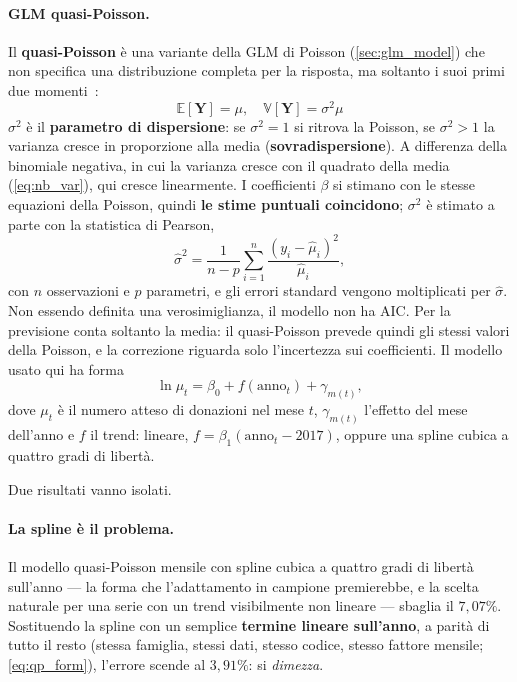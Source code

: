 \paragraph{GLM quasi-Poisson.}
Il \textbf{quasi-Poisson} è una variante della GLM di Poisson
(\cref{sec:glm_model}) che non specifica una distribuzione completa per la
risposta, ma soltanto i suoi primi due momenti~\cite{McCullaghNelder1989}:
\begin{equation}
    \mathbb{E}[\mathbf{Y}] = \mu, \quad \mathbb{V}[\mathbf{Y}] = \sigma^{2}\mu
\end{equation}
$\sigma^{2}$ è il \textbf{parametro di dispersione}: se $\sigma^{2} = 1$ si
ritrova la Poisson, se $\sigma^{2} > 1$ la varianza cresce in proporzione alla
media (\textbf{sovradispersione}). A differenza della binomiale negativa, in cui
la varianza cresce con il quadrato della media (\cref{eq:nb_var}), qui cresce
linearmente.
\newline
I coefficienti $\beta$ si stimano con le stesse equazioni della Poisson, quindi
\textbf{le stime puntuali coincidono}; $\sigma^{2}$ è stimato a parte con la
statistica di Pearson,
\begin{equation}
    \hat{\sigma}^{2} = \frac{1}{n-p}\sum_{i=1}^{n}
    \frac{(y_{i}-\hat{\mu}_{i})^{2}}{\hat{\mu}_{i}},
\end{equation}
con $n$ osservazioni e $p$ parametri, e gli errori standard vengono
moltiplicati per $\hat{\sigma}$. Non essendo definita una verosimiglianza, il
modello non ha AIC.
\newline
Per la previsione conta soltanto la media: il quasi-Poisson prevede quindi gli
stessi valori della Poisson, e la correzione riguarda solo l'incertezza sui
coefficienti. Il modello usato qui ha forma
\begin{equation}
    \ln \mu_{t} = \beta_{0} + f(\text{anno}_{t}) + \gamma_{m(t)},
    \label{eq:qp_form}
\end{equation}
dove $\mu_{t}$ è il numero atteso di donazioni nel mese $t$, $\gamma_{m(t)}$
l'effetto del mese dell'anno e $f$ il trend: lineare,
$f = \beta_{1}(\text{anno}_{t} - 2017)$, oppure una spline cubica a quattro
gradi di libertà.

Due risultati vanno isolati.

\paragraph{La spline è il problema.}
Il modello quasi-Poisson mensile con spline cubica a quattro gradi di libertà
sull'anno --- la forma che l'adattamento in campione premierebbe, e la scelta
naturale per una serie con un trend visibilmente non lineare --- sbaglia il
$7{,}07\%$. Sostituendo la spline con un semplice \textbf{termine
lineare sull'anno}, a parità di tutto il resto (stessa famiglia, stessi dati,
stesso codice, stesso fattore mensile; \cref{eq:qp_form}), l'errore
scende al $3{,}91\%$: si \emph{dimezza}.

